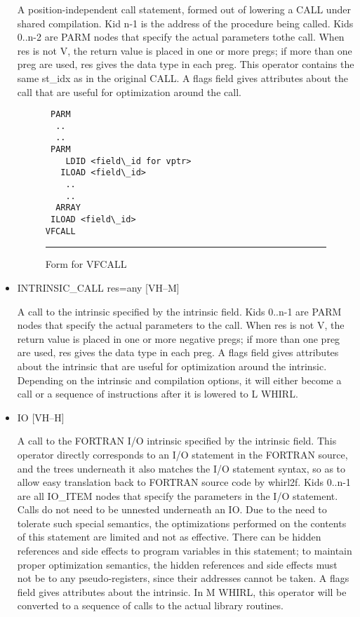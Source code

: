 \begin{itemize}
A position-independent call statement, formed out of lowering a
CALL under shared compilation. Kid n-1 is the address of the
procedure being
called. Kids 0..n-2 are
%
PARM nodes that specify the actual parameters
tothe call. When res is not V, the return value is placed in one
or more pregs; if more than one preg are used, res gives the data type in
each preg. This operator contains the same st\_idx as in the original
CALL. A flags field gives attributes about the call that are useful
for optimization around the call. 

\begin{figure}
\begin{center}
\begin{minipage}{4in}
%
%
%
%
\begin{verbatim}
 PARM
  ..
  ..
 PARM
    LDID <field\_id for vptr>
   ILOAD <field\_id> 
    ..
    ..
  ARRAY
 ILOAD <field\_id> 
VFCALL
\end{verbatim}
\end{minipage}
\end{center}
\hrule
\caption{Form for VFCALL}
\label{vfcall-form}
\end{figure}


%
\item  INTRINSIC\_CALL res=any  \hfill [VH--M]

A call to the intrinsic specified by the intrinsic field. Kids
0..n-1 are
%
PARM nodes that specify the actual parameters to the
call. When res is not V, the return value is placed in one or more
negative pregs; if more
than one preg are used, res gives the data type in each preg. A
flags field gives attributes about the intrinsic that are useful
for optimization around the intrinsic. Depending on the intrinsic
and compilation options, it will either become a call or a sequence
of instructions after it is lowered to L WHIRL. 

\item
{}%
IO \hfill [VH--H]

A call to the FORTRAN I/O intrinsic specified by the intrinsic
field. This operator directly corresponds to an I/O statement in
the FORTRAN
source, and the trees underneath it also matches the I/O statement
syntax, so as to allow easy translation back to FORTRAN source code
by whirl2f. Kids 0..n-1 are all
%
IO\_ITEM nodes that specify the
parameters in the I/O statement. Calls do not need to be unnested
underneath an
%
IO. Due to the need to tolerate such special semantics, the
optimizations performed on the contents of this statement are
limited and not as effective. There can be hidden references and
side effects to program variables in this statement; to maintain
proper optimization semantics, the hidden references and side
effects must not be to any pseudo-registers, since their addresses
cannot be taken. A flags field gives attributes about the intrinsic.
In M WHIRL, this operator will be converted to a sequence of calls
to the actual library routines. 


\end{itemize}
